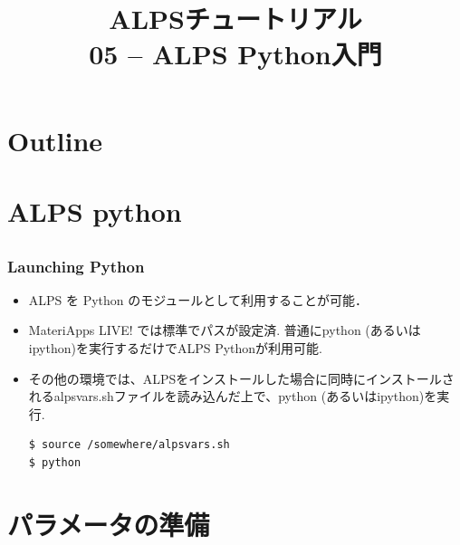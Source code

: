 
\title{ALPSチュートリアル \\ 05 -- ALPS Python入門}



\begin{frame}
 \titlepage
\end{frame}

\section*{Outline}
\begin{frame}
 \tableofcontents
\end{frame}

\section{ALPS python}

\subsection*{\redm\whiteb\greenb}
\begin{frame}[t,fragile]
 \frametitle{Launching Python}
 \begin{itemize}
 \item \alert{ALPS を Python のモジュールとして利用することが可能．}

 \item MateriApps LIVE! では標準でパスが設定済. 普通にpython (あるいはipython)を実行するだけでALPS Pythonが利用可能.

 \item その他の環境では、ALPSをインストールした場合に同時にインストールされるalpsvars.shファイルを読み込んだ上で、python (あるいはipython)を実行.
\begin{lstlisting}
$ source /somewhere/alpsvars.sh
$ python
\end{lstlisting}
\end{itemize}
\end{frame}

\section{パラメータの準備}

